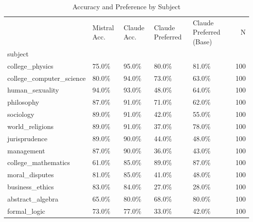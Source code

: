 \begin{table}[h]
\caption{Accuracy and Preference by Subject}
\label{tab:by_subject}
\begin{tabular}{lllllr}
\toprule
 & Mistral Acc. & Claude Acc. & Claude Preferred & Claude Preferred (Base) & N \\
subject &  &  &  &  &  \\
\midrule
college\_physics & 75.0\% & 95.0\% & 80.0\% & 81.0\% & 100 \\
college\_computer\_science & 80.0\% & 94.0\% & 73.0\% & 63.0\% & 100 \\
human\_sexuality & 94.0\% & 93.0\% & 48.0\% & 64.0\% & 100 \\
philosophy & 87.0\% & 91.0\% & 71.0\% & 62.0\% & 100 \\
sociology & 89.0\% & 91.0\% & 42.0\% & 55.0\% & 100 \\
world\_religions & 89.0\% & 91.0\% & 37.0\% & 78.0\% & 100 \\
jurisprudence & 89.0\% & 90.0\% & 44.0\% & 48.0\% & 100 \\
management & 87.0\% & 90.0\% & 36.0\% & 43.0\% & 100 \\
college\_mathematics & 61.0\% & 85.0\% & 89.0\% & 87.0\% & 100 \\
moral\_disputes & 81.0\% & 85.0\% & 41.0\% & 48.0\% & 100 \\
business\_ethics & 83.0\% & 84.0\% & 27.0\% & 28.0\% & 100 \\
abstract\_algebra & 65.0\% & 80.0\% & 68.0\% & 80.0\% & 100 \\
formal\_logic & 73.0\% & 77.0\% & 33.0\% & 42.0\% & 100 \\
\bottomrule
\end{tabular}
\end{table}
